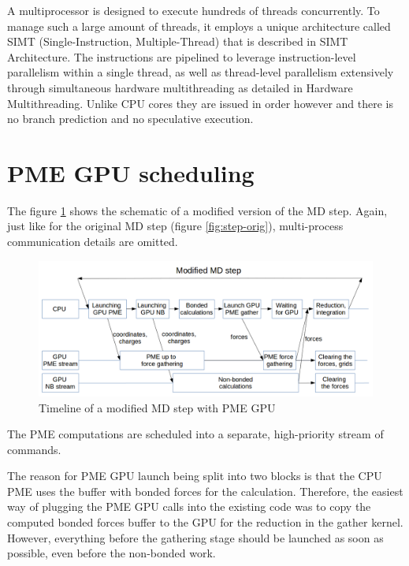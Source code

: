 \documentclass[12pt,a4paper]{report}
\begin{document}
A multiprocessor is designed to execute hundreds of threads concurrently. To manage such a large amount of threads, it employs a unique architecture called SIMT (Single-Instruction, Multiple-Thread) that is described in SIMT Architecture. The instructions are pipelined to leverage instruction-level parallelism within a single thread, as well as thread-level parallelism extensively through simultaneous hardware multithreading as detailed in Hardware Multithreading. Unlike CPU cores they are issued in order however and there is no branch prediction and no speculative execution.

\fi



\section{PME GPU scheduling}

The figure \ref{fig:step-gpu} shows the schematic of a modified version of the MD step. Again, just like for the original MD step (figure \ref{fig:step-orig}), multi-process communication details are omitted. 
\begin{figure}[h!]
    \centering
    \includegraphics[width=1\textwidth]{pics/mdstep-gpu.png}
    \caption{Timeline of a modified MD step with PME GPU}
    \label{fig:step-gpu}
\end{figure}
\FloatBarrier

The PME computations are scheduled into a separate, high-priority stream of commands.

The reason for PME GPU launch being split into two blocks is that the CPU PME uses the buffer with bonded forces for the calculation.
Therefore, the easiest way of plugging the PME GPU calls into the existing code was to copy the computed bonded forces buffer to the GPU for the reduction in the gather kernel. However, everything before the gathering stage should be launched as soon as possible, even before the non-bonded work.
\end{document}
